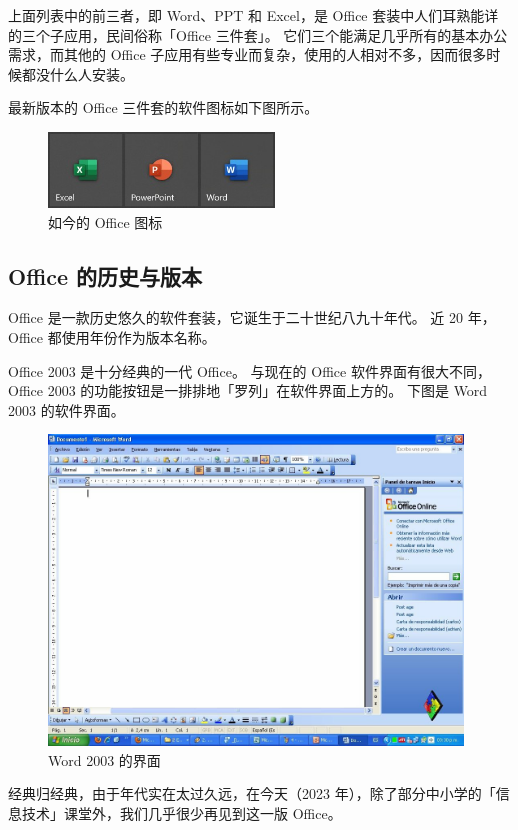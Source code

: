 上面列表中的前三者，即 Word、PPT 和 Excel，是 Office 套装中人们耳熟能详的三个子应用，民间俗称「Office 三件套」。
它们三个能满足几乎所有的基本办公需求，而其他的 Office 子应用有些专业而复杂，使用的人相对不多，因而很多时候都没什么人安装。

最新版本的 Office 三件套的软件图标如下图所示。

\begin{figure}[htb!]
  \centering
  \includegraphics[width=6cm]{assets/Office_Icons.jpg}
  \caption{如今的 Office 图标}
  \label{Office_Icons}
\end{figure}

\subsection{Office 的历史与版本}

Office 是一款历史悠久的软件套装，它诞生于二十世纪八九十年代。
近 20 年，Office 都使用年份作为版本名称。

Office 2003 是十分经典的一代 Office。
与现在的 Office 软件界面有很大不同，Office 2003 的功能按钮是一排排地「罗列」在软件界面上方的。
下图是 Word 2003 的软件界面。

\begin{figure}[htb!]
  \centering
  \includegraphics[width=11cm]{assets/Word_2003.jpg}
  \caption{Word 2003 的界面}
  \label{Word_2003}
\end{figure}

经典归经典，由于年代实在太过久远，在今天（2023 年），除了部分中小学的「信息技术」课堂外，我们几乎很少再见到这一版 Office。

